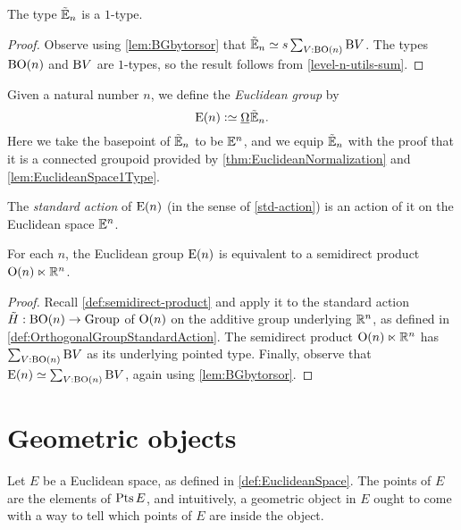 \begin{lemma}\label{lem:EuclideanSpace1Type}
  The type ${\tilde {\mathbb E}}_n$ is a $1$-type.
\end{lemma}

\begin{proof}
  Observe using \cref{lem:BGbytorsor} that ${\tilde {\mathbb E}}_n \simeq s\sum_{V:\mathrm{B} \mathrm{O}(n)}
  \mathrm{B} V$.  The types $\mathrm{B} \mathrm{O}(n)$ and $\mathrm{B} V$ are $1$-types, so the result
  follows from \cref{level-n-utils-sum}.
\end{proof}

\begin{definition}\label{def:EuclideanGroup}
  Given a natural number $n$, we define the {\em Euclidean group} by
  $$\EucGp n \defeq \mkgroup \ES_n.$$  Here we take the basepoint of ${\tilde {\mathbb E}}_n$ to be $\mathbb E^n$,
  and we equip ${\tilde {\mathbb E}}_n$ with the proof that it is a connected groupoid provided
  by \cref{thm:EuclideanNormalization} and \cref{lem:EuclideanSpace1Type}.
\end{definition}

The {\em standard action} of $\mathrm{E}(n)$ (in the sense of \cref{std-action}) is
an action of it on the Euclidean space $\mathbb E^n$.

\begin{theorem}\label{thm:EuclideanGroupSemidirect}
  For each $n$, the Euclidean group $\mathrm{E}(n)$ is equivalent to a semidirect
  product $\mathrm{O}(n) \ltimes \mathbb{R}^n$.
\end{theorem}

\begin{proof}
  Recall \cref{def:semidirect-product} and apply it to the standard action
  $\tilde H : \mathrm{B} \mathrm{O}(n) \to \mathrm{Group}$ of $\mathrm{O}(n)$ on the additive group
  underlying $\mathbb{R}^n$, as defined in \cref{def:OrthogonalGroupStandardAction}.
  The semidirect product $\mathrm{O}(n) \ltimes \mathbb{R}^n$ has
  $\sum_{V:\mathrm{B} \mathrm{O}(n)} \mathrm{B} V$ as its underlying pointed type.
  Finally, observe that $\mathrm{E}(n) \simeq \sum_{V:\mathrm{B} \mathrm{O}(n)} \mathrm{B} V$, again
  using \cref{lem:BGbytorsor}.
\end{proof}

\section{Geometric objects}

Let $E$ be a Euclidean space, as defined in \cref{def:EuclideanSpace}.  The
points of $E$ are the elements of $\Points E$, and intuitively, a geometric
object in $E$ ought to come with a way to tell which points of $E$ are inside
the object.

